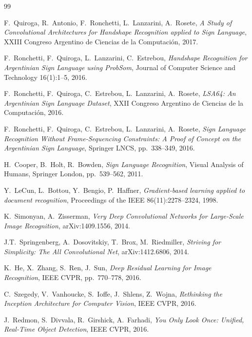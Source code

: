 \documentclass[a4paper,11pt]{article}
\begin{document}
\begin{thebibliography}{99}

F.~Quiroga, R.~Antonio, F.~Ronchetti, L.~Lanzarini, A.~Rosete,
\emph{A Study of Convolutional Architectures for Handshape Recognition applied to Sign Language},
XXIII Congreso Argentino de Ciencias de la Computación, 2017.

F.~Ronchetti, F.~Quiroga, L.~Lanzarini, C.~Estrebou,
\emph{Handshape Recognition for Argentinian Sign Language using ProbSom},
Journal of Computer Science and Technology 16(1):1--5, 2016.

F.~Ronchetti, F.~Quiroga, C.~Estrebou, L.~Lanzarini, A.~Rosete,
\emph{LSA64: An Argentinian Sign Language Dataset},
XXII Congreso Argentino de Ciencias de la Computación, 2016.

F.~Ronchetti, F.~Quiroga, C.~Estrebou, L.~Lanzarini, A.~Rosete,
\emph{Sign Language Recognition Without Frame-Sequencing Constraints: A Proof of Concept on the Argentinian Sign Language},
Springer LNCS, pp.~338--349, 2016.

H.~Cooper, B.~Holt, R.~Bowden,
\emph{Sign Language Recognition},
Visual Analysis of Humans, Springer London, pp.~539--562, 2011.

Y.~LeCun, L.~Bottou, Y.~Bengio, P.~Haffner,
\emph{Gradient-based learning applied to document recognition},
Proceedings of the IEEE 86(11):2278--2324, 1998.

K.~Simonyan, A.~Zisserman,
\emph{Very Deep Convolutional Networks for Large-Scale Image Recognition},
arXiv:1409.1556, 2014.

J.T.~Springenberg, A.~Dosovitskiy, T.~Brox, M.~Riedmiller,
\emph{Striving for Simplicity: The All Convolutional Net},
arXiv:1412.6806, 2014.

K.~He, X.~Zhang, S.~Ren, J.~Sun,
\emph{Deep Residual Learning for Image Recognition},
IEEE CVPR, pp.~770--778, 2016.

C.~Szegedy, V.~Vanhoucke, S.~Ioffe, J.~Shlens, Z.~Wojna,
\emph{Rethinking the Inception Architecture for Computer Vision},
IEEE CVPR, 2016.

J.~Redmon, S.~Divvala, R.~Girshick, A.~Farhadi,
\emph{You Only Look Once: Unified, Real-Time Object Detection},
IEEE CVPR, 2016.


\end{thebibliography}
\end{document}
